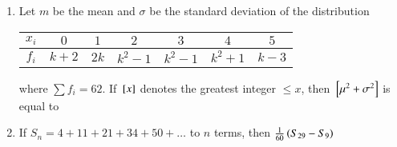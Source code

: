 \documentclass[journal]{IEEEtran}
\numberwithin{equation}{enumi}
\numberwithin{figure}{enumi}
\begin{document}
\begin{enumerate}
    \begin{figure}[H]
        \centering
    \end{figure}

    \item  
    Let $m$ be the mean and $\sigma$ be the standard deviation of the distribution
    \begin{table}[H]
        \centering
        \begin{tabular}{|c |c |c |c |c |c |c |}
        
        \hline
             $x_i$ & $0$ & $1$ & $2$ & $3$ & $4$ & $5$ \\
        \hline
             $f_i$ & $k + 2$ & $2k$ & $k^2 - 1$ & $k^2 -1$ & $k^2 +1$ & $k - 3$ \\
        \hline
        \end{tabular}
    \end{table}
    where $\sum f_i = 62$. If ${}\left[x\right]$ denotes the greatest integer $\leq x $, then ${}\left[\mu^2 + \sigma^2\right]$ is equal to

    \hfill{}

    \begin{enumerate}
    \end{enumerate}

    \item 
    If $S_n = 4 + 11 + 21 + 34 + 50 + \dots$ to $n$ terms, then $\frac{1}{60}\left(S_{29} - S_9\right)$ 
    
    \hfill{}

    \begin{enumerate}
    \end{enumerate}


\end{enumerate}
\end{document}
